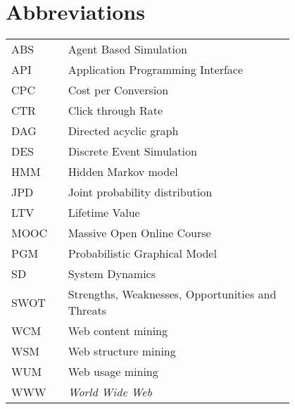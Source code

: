 \chapter*{Abbreviations}

\begin{flushleft}
\begin{tabular}{l p{0.8\linewidth}}
ABS      & Agent Based Simulation\\
API      & Application Programming Interface\\
CPC      & Cost per Conversion\\
CTR      & Click through Rate\\
DAG      & Directed acyclic graph\\
DES      & Discrete Event Simulation\\
HMM      & Hidden Markov model\\
JPD      & Joint probability distribution\\
LTV      & Lifetime Value\\
MOOC     & Massive Open Online Course\\
PGM      & Probabilistic Graphical Model\\
SD       & System Dynamics\\
SWOT     & Strengths, Weaknesses, Opportunities and Threats\\
WCM      & Web content mining\\
WSM      & Web structure mining\\
WUM      & Web usage mining\\
WWW      & \emph{World Wide Web}
\end{tabular}
\end{flushleft}
